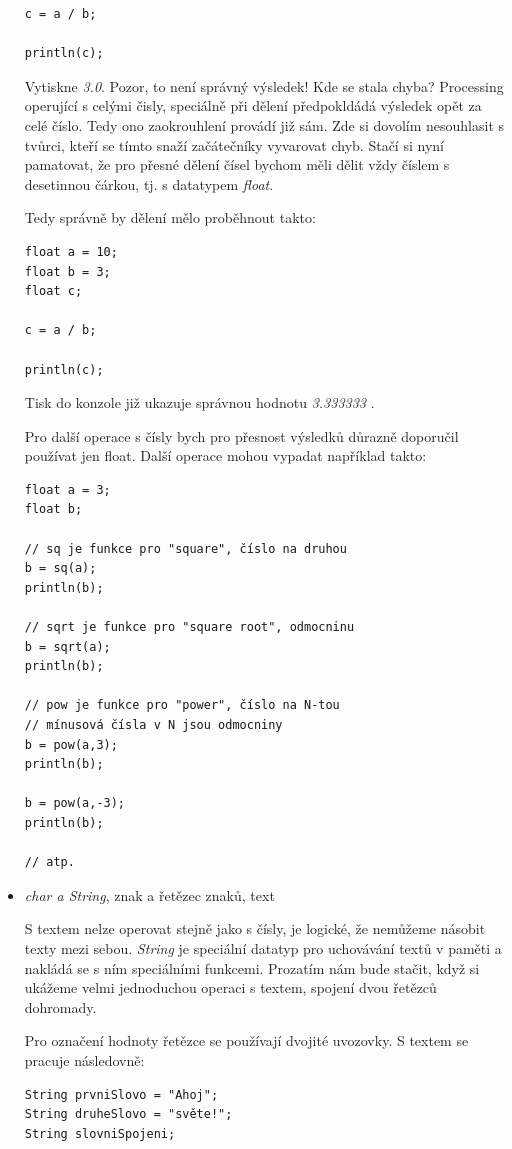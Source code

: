 \documentclass[11pt]{article}
\begin{document}
\begin{itemize}
\begin{lstlisting}
c = a / b;

println(c); 
\end{lstlisting}

Vytiskne {\em 3.0}. Pozor, to není správný výsledek! Kde se stala chyba? Processing operující s celými čisly, speciálně při dělení předpokldádá výsledek opět za celé číslo. Tedy ono zaokrouhlení provádí již sám. Zde si dovolím nesouhlasit s tvůrci, kteří se tímto snaží začátečníky vyvarovat chyb. Stačí si nyní pamatovat, že pro přesné dělení čísel bychom měli dělit vždy číslem s desetinnou čárkou, tj. s datatypem {\em float}.

Tedy správně by dělení mělo proběhnout takto:

\begin{lstlisting}
float a = 10;
float b = 3;
float c;

c = a / b;

println(c); 
\end{lstlisting}

Tisk do konzole již ukazuje správnou hodnotu {\em 3.333333} .

Pro další operace s čísly bych pro přesnost výsledků důrazně doporučil používat jen float. Další operace mohou vypadat například takto:

\begin{lstlisting}
float a = 3;
float b;

// sq je funkce pro "square", číslo na druhou
b = sq(a);
println(b);

// sqrt je funkce pro "square root", odmocninu
b = sqrt(a);
println(b);

// pow je funkce pro "power", číslo na N-tou
// mínusová čísla v N jsou odmocniny
b = pow(a,3);
println(b);

b = pow(a,-3);
println(b);

// atp.
\end{lstlisting}

\item{{\em char a String}, znak a řetězec znaků, text}

S textem nelze operovat stejně jako s čísly, je logické, že nemůžeme násobit texty mezi sebou. {\em String} je speciální datatyp pro uchovávání textů v paměti a nakládá se s ním speciálními funkcemi. Prozatím nám bude stačit, když si ukážeme velmi jednoduchou operaci s textem, spojení dvou řetězců dohromady.

Pro označení hodnoty řetězce se používají dvojité uvozovky. S textem se pracuje následovně:

\begin{lstlisting}
String prvniSlovo = "Ahoj";
String druheSlovo = "světe!";
String slovniSpojeni;


\end{lstlisting}
\end{itemize}
\end{document}
